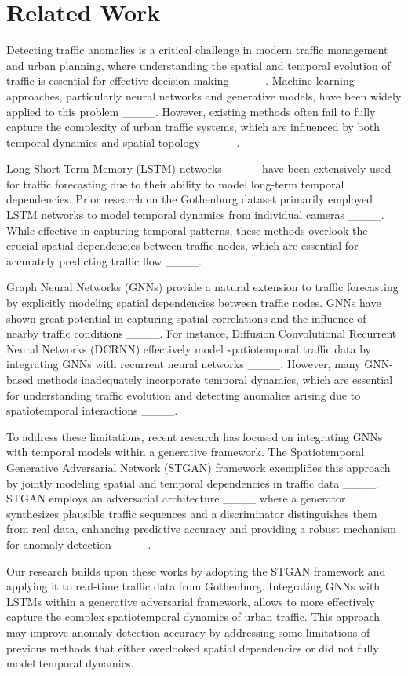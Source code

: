 \section{Related Work}
\label{SOTASection}

Detecting traffic anomalies is a critical challenge in modern traffic management and urban planning, where understanding the spatial and temporal evolution of traffic is essential for effective decision-making ____. Machine learning approaches, particularly neural networks and generative models, have been widely applied to this problem ____. However, existing methods often fail to fully capture the complexity of urban traffic systems, which are influenced by both temporal dynamics and spatial topology ____.

Long Short-Term Memory (LSTM) networks ____ have been extensively used for traffic forecasting due to their ability to model long-term temporal dependencies. Prior research on the Gothenburg dataset primarily employed LSTM networks to model temporal dynamics from individual cameras ____. While effective in capturing temporal patterns, these methods overlook the crucial spatial dependencies between traffic nodes, which are essential for accurately predicting traffic flow ____.

Graph Neural Networks (GNNs) provide a natural extension to traffic forecasting by explicitly modeling spatial dependencies between traffic nodes. GNNs have shown great potential in capturing spatial correlations and the influence of nearby traffic conditions ____. For instance, Diffusion Convolutional Recurrent Neural Networks (DCRNN) effectively model spatiotemporal traffic data by integrating GNNs with recurrent neural networks ____. However, many GNN-based methods inadequately incorporate temporal dynamics, which are essential for understanding traffic evolution and detecting anomalies arising due to spatiotemporal interactions ____.

To address these limitations, recent research has focused on integrating GNNs with temporal models within a generative framework. The Spatiotemporal Generative Adversarial Network (STGAN) framework exemplifies this approach by jointly modeling spatial and temporal dependencies in traffic data ____. STGAN employs an adversarial architecture ____ where a generator synthesizes plausible traffic sequences and a discriminator distinguishes them from real data, enhancing predictive accuracy and providing a robust mechanism for anomaly detection ____.

Our research builds upon these works by adopting the STGAN framework and applying it to real-time traffic data from Gothenburg. Integrating GNNs with LSTMs within a generative adversarial framework, allows to more effectively capture the complex spatiotemporal dynamics of urban traffic. This approach may improve anomaly detection accuracy by addressing some limitations of previous methods that either overlooked spatial dependencies or did not fully model temporal dynamics.